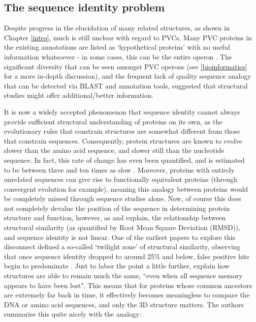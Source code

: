 \subsection{The sequence identity problem}
Despite progress in the elucidation of many related structures, as shown in Chapter \ref{intro}, much is still unclear with regard to PVCs. Many PVC proteins in the existing \Pa{} annotations are listed as `hypothetical proteins' with no useful information whatsoever - in some cases, this can be the entire operon \citep{Duchaud2003}. The significant diversity that can be seen amongst PVC operons (see \vref{bioinformatics} for a more in-depth discussion), and the frequent lack of quality sequence analogy that can be detected via BLAST and annotation tools, suggested that structural studies might offer additional/better information.

It is now a widely accepted phenomenon that sequence identity cannot always provide sufficient structural understanding of proteins on its own, as the evolutionary rules that constrain structures are somewhat different from those that constrain sequences. Consequently, protein structures are known to evolve slower than the amino acid sequence, and slower still than the nucleotide sequence. In fact, this rate of change has even been quantified, and is estimated to be between three and ten times as slow \citep{Illergard2009}. Moreover, proteins with entirely unrelated sequences can give rise to functionally equivalent proteins (through convergent evolution for example), meaning this analogy between proteins would be completely missed through sequence studies alone. Now, of course this does not completely devalue the position of the sequence in determining protein structure and function, however, as \cite{Illergard2009} and \cite{Chothia1986} explain, the relationship between structural similarity (as quantified by Root Mean Square Deviation (RMSD)), and sequence identity is not linear. One of the earliest papers to explore this disconnect defined a so-called `twilight zone' of structural similarity, observing that once sequence identity dropped to around 25\% and below, false positive hits begin to predominate \citep{rost1999twilight}. Just to labor the point a little further, \cite{Holm1996} explain how structures are able to remain much the same, ``even when all sequence memory appears to have been lost". This means that for proteins whose common ancestors are extremely far back in time, it effectively becomes meaningless to compare the DNA or amino acid sequences, and only the 3D structure matters. The authors summarise this quite nicely with the analogy:

